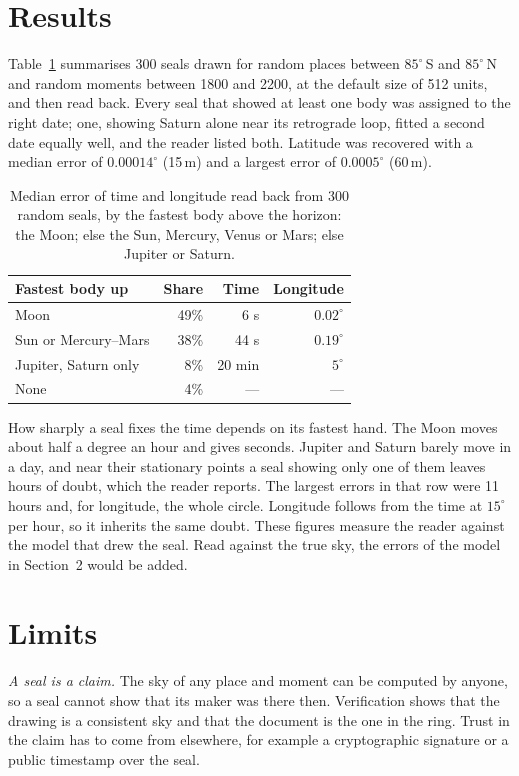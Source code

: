 \documentclass[10pt,twocolumn,a4paper]{article}
\begin{document}
\section{Results}

Table~\ref{tab:results} summarises 300 seals drawn for random places
between $85^\circ$\,S and $85^\circ$\,N and random moments between 1800 and
2200, at the default size of 512 units, and then read back. Every seal that
showed at least one body was assigned to the right date; one, showing Saturn
alone near its retrograde loop, fitted a second date equally well, and the
reader listed both. Latitude was
recovered with a median error of $0.00014^\circ$ (15\,m) and a largest error of
$0.0005^\circ$ (60\,m).

\begin{table}[t]
\centering\small
\begin{tabular}{@{}lrrr@{}}
\toprule
Fastest body up & Share & Time & Longitude \\
\midrule
Moon & 49\% & 6 s & $0.02^\circ$ \\
Sun or Mercury--Mars & 38\% & 44 s & $0.19^\circ$ \\
Jupiter, Saturn only & 8\% & 20 min & $5^\circ$ \\
None & 4\% & --- & --- \\
\bottomrule
\end{tabular}
\caption{Median error of time and longitude read back from 300 random
seals, by the fastest body above the horizon: the Moon; else the Sun,
Mercury, Venus or Mars; else Jupiter or Saturn.}
\label{tab:results}
\end{table}

How sharply a seal fixes the time depends on its fastest hand. The Moon
moves about half a degree an hour and gives seconds. Jupiter and Saturn
barely move in a day, and near their stationary points a seal showing only
one of them leaves hours of doubt, which the reader reports. The largest
errors in that row were 11 hours and, for longitude, the whole circle. Longitude
follows from the time at $15^\circ$ per hour, so it inherits the same doubt.
These figures measure the reader against the model that drew the seal. Read
against the true sky, the errors of the model in Section~2 would be added.

\section{Limits}

\emph{A seal is a claim.} The sky of any place and moment can be computed by
anyone, so a seal cannot show that its maker was there then. Verification
shows that the drawing is a consistent sky and that the document is the one
in the ring. Trust in the claim has to come from elsewhere, for example a
cryptographic signature or a public timestamp over the seal.
\end{document}
